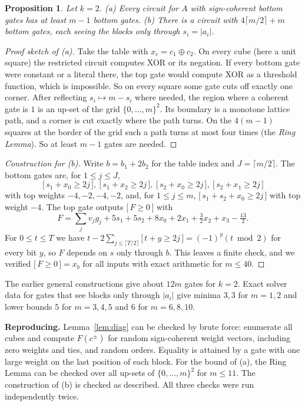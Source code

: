 \documentclass[11pt,letterpaper]{article}
\newtheorem{proposition}[theorem]{Proposition}
\theoremstyle{remark}
\newcommand{\ind}[1]{\bigl[\,#1\,\bigr]}
\newcommand{\smalltitle}[1]{\textbf{\color{ink}#1}\quad}
\begin{document}
\begin{proposition}\label{prop:k2}
Let $k=2$. (a) Every circuit for $A$ with sign-coherent bottom gates has at
least $m-1$ bottom gates. (b) There is a circuit with $4\lceil m/2\rceil+m$
bottom gates, each seeing the blocks only through $s_i=|a_i|$.
\end{proposition}
\begin{proof}[Proof sketch of (a)]
Take the table with $x_c=c_1\oplus c_2$. On every cube (here a unit square)
the restricted circuit computes XOR or its negation. If every bottom gate were
constant or a literal there, the top gate would compute XOR as a threshold
function, which is impossible. So on every square some gate cuts off exactly
one corner. After reflecting $s_i\mapsto m-s_i$ where needed, the region where
a coherent gate is $1$ is an up-set of the grid $\{0,\dots,m\}^2$. Its
boundary is a monotone lattice path, and a corner is cut exactly where the
path turns. On the $4(m-1)$ squares at the border of the grid such a path
turns at most four times (the \emph{Ring Lemma}). So at least $m-1$ gates are needed.
\end{proof}
\begin{proof}[Construction for (b)]
Write $b=b_1+2b_2$ for the table index and $J=\lceil m/2\rceil$. The bottom
gates are, for $1\le j\le J$,
\[
\ind{s_1+x_0\ge2j},\ \ind{s_1+x_2\ge2j},\ \ind{s_2+x_0\ge2j},\ \ind{s_2+x_1\ge2j}
\]
with top weights $-4,-2,-4,-2$, and, for $1\le j\le m$, $\ind{s_1+s_2+x_0\ge2j}$
with top weight $-4$. The top gate outputs $\ind{F\ge0}$ with
\[
F=\sum_j v_jg_j+5s_1+5s_2+8x_0+2x_1+\tfrac32x_2+x_3-\tfrac{13}2 .
\]
For $0\le t\le T$ we have $t-2\sum_{j\le\lceil T/2\rceil}\ind{t+y\ge2j}=(-1)^y(t\bmod2)$
for every bit $y$, so $F$ depends on $s$ only through $b$. This leaves a
finite check, and we verified $\ind{F\ge0}=x_b$ for all inputs with exact
arithmetic for $m\le40$.
\end{proof}

The earlier general constructions give about $12m$ gates for $k=2$. Exact
solver data for gates that see blocks only through $|a_i|$ give minima $3,3$
for $m=1,2$ and lower bounds $5$ for $m=3,4,5$ and $6$ for $m=6,8,10$.

\smalltitle{Reproducing.}
Lemma~\ref{lem:diag} can be checked by brute force: enumerate all cubes and
compute $F(c^\pm)$ for random sign-coherent weight vectors, including zero
weights and ties, and random orders. Equality is attained by a gate with one
large weight on the last position of each block. For the bound of (a), the
Ring Lemma can be checked over all up-sets of $\{0,\dots,m\}^2$ for
$m\le11$. The construction of (b) is checked as described. All three checks
were run independently twice.
\end{document}
